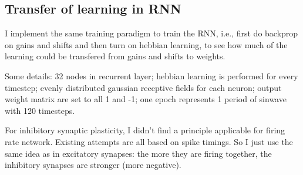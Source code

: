 \documentclass[12pt, a4paper]{article}
\begin{document}
\newpage

\subsection*{Transfer of learning in RNN}

I implement the same training paradigm to train the RNN, i.e., first do backprop on gains and shifts and then turn on hebbian learning, to see how much of the learning could be transfered from gains and shifts to weights.

Some details: 32 nodes in recurrent layer; hebbian learning is performed for every timestep; evenly distributed gaussian receptive fields for each neuron; output weight matrix are set to all 1 and -1; one epoch represents 1 period of sinwave with 120 timesteps.

For inhibitory synaptic plasticity, I didn't find a principle applicable for firing rate network. Existing attempts are all based on spike timings. So I just use the same idea as in excitatory synapses: the more they are firing together, the inhibitory synapses are stronger (more negative).
\end{document}
